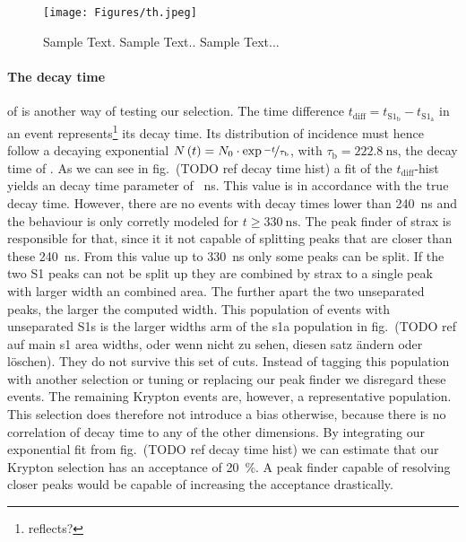 \begin{figure}
\centering
\texttt{[image: Figures/th.jpeg]}  %
\caption[Kr z-histogram Homogeneity]{
        Sample Text.
        Sample Text..
        Sample Text...
    }
\label{fig:z-hist-homogen}
\end{figure}



\paragraph{The decay time} of  is another way of testing our selection.
The time difference $ t_\mathrm{diff} = t_{\mathrm{S}1_\mathrm{b}} - t_{\mathrm{S}1_\mathrm{a}} $ in an event represents\footnote{reflects?} its decay time.
Its distribution of incidence must hence follow a decaying exponential $ N \left( t \right) = N_0 \cdot \exp{\nicefrac{-t}{\tau_\mathrm{b}}} $, with $ \tau_\mathrm{b} = \SI{222.8}{\nano\s} $, the decay time of .
As we can see in fig.~(TODO ref decay time hist) a fit of the $ t_\mathrm{diff} $-hist yields an decay time parameter of \SI{}{\nano\s}. %
This value is in accordance with the true decay time. %
However, there are no events with decay times lower than \SI{240}{\nano\s} and the behaviour is only corretly modeled for $ t \ge \SI{330}{\nano\s} $.
The peak finder of strax is responsible for that, since it it not capable of splitting peaks that are closer than these \SI{240}{\nano\s}.
From this value up to \SI{330}{\nano\s} only some peaks can be split.
If the two S1 peaks can not be split up they are combined by strax to a single peak with larger width an combined area.
The further apart the two unseparated peaks, the larger the computed width.
This population of events with unseparated S1s is the larger widths arm of the \gls{s1a} population in fig.~(TODO ref auf main s1 area widths, oder wenn nicht zu sehen, diesen satz ändern oder löschen).
They do not survive this set of cuts.
Instead of tagging this population with another selection or tuning or replacing our peak finder we disregard these events.
The remaining Krypton events are, however, a representative population.
This selection does therefore not introduce a bias otherwise, because there is no correlation of decay time to any of the other dimensions.
By integrating our exponential fit from fig.~(TODO ref decay time hist) we can estimate that our Krypton selection has an acceptance of \SI{20}{\%}.
A peak finder capable of resolving closer peaks would be capable of increasing the acceptance drastically.



\FloatBarrier

